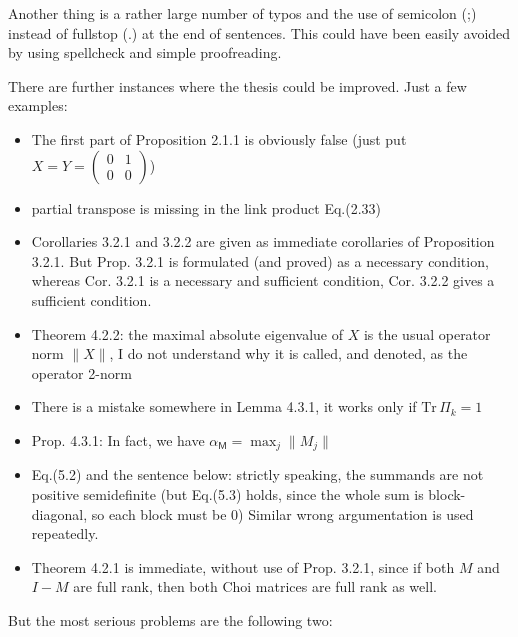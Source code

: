 \documentclass[12pt]{article}
\begin{document}
Another thing is a rather large number of typos and the use of semicolon (;) instead of fullstop (.) at the end of
sentences. This could have been easily avoided by using spellcheck and simple
proofreading. 

There are further instances where the thesis could be improved.  Just a few examples:
\begin{itemize}
\item The first part of Proposition 2.1.1 is obviously false (just put $X=Y=\begin{pmatrix} 0 & 1\\ 0 &
0\end{pmatrix}$)

\item partial transpose is missing in the link product Eq.(2.33)

\item Corollaries 3.2.1 and 3.2.2 are given as immediate corollaries of Proposition
3.2.1. But Prop. 3.2.1 is formulated (and proved) as a necessary condition, whereas Cor.
3.2.1 is a necessary and sufficient condition, Cor. 3.2.2 gives a sufficient condition.

\item Theorem 4.2.2:  the maximal absolute eigenvalue of $X$ is the usual operator norm
$\|X\|$, I do not understand why it is called, and denoted, as the operator 2-norm 

\item There is a mistake somewhere in Lemma 4.3.1, it works only if $\mathrm{Tr}\,
\Pi_k=1$

\item Prop. 4.3.1: In fact, we have $\alpha_{\mathsf M}=\max_j \|M_j\|$

\item Eq.(5.2) and the sentence below: strictly speaking, the summands are not positive
semidefinite (but Eq.(5.3) holds, since the whole sum is block-diagonal, so each block
must be 0) Similar wrong argumentation is used repeatedly.

\item Theorem 4.2.1 is immediate, without use of Prop. 3.2.1, since if both $M$ and $I-M$
are full rank, then both Choi matrices are full rank as well.

\end{itemize}


But the most serious problems are the following two:
\end{document}
